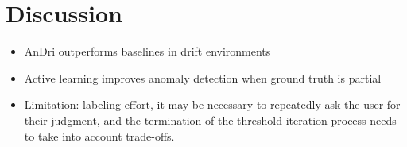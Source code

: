 \section{Discussion}
\begin{itemize}
    \item AnDri outperforms baselines in drift environments
    \item Active learning improves anomaly detection when ground truth is partial
    \item Limitation: labeling effort, it may be necessary to repeatedly ask the user for their judgment, and the termination of the threshold iteration process needs to take into account trade-offs.
\end{itemize}
